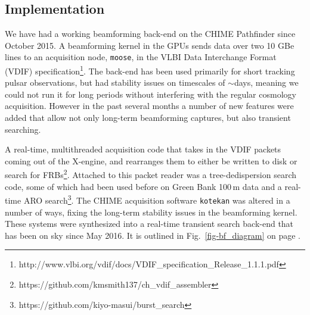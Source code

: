 \subsection{Implementation}

We have had a working beamforming back-end on the CHIME 
Pathfinder since October 2015. 
A beamforming kernel in the GPUs sends data over two 10 GBe
lines to an acquisition node, {\tt moose}, 
in the VLBI Data Interchange Format (VDIF) 
specification\footnote{http://www.vlbi.org/vdif/docs/VDIF\_specification\_Release\_1.1.1.pdf}. 
The back-end has been used primarily 
for short tracking pulsar observations, but had stability issues 
on timescales of $\sim$days, meaning we could not run it 
for long periods without interfering with the regular cosmology acquisition. 
However in the past several months a number of new features 
were added that allow not only long-term beamforming captures, 
but also transient searching. 
 
A real-time, multithreaded acquisition code that takes in the VDIF 
packets coming out of the X-engine, and rearranges them to either be written to disk or search for 
FRBs\footnote{https://github.com/kmsmith137/ch\_vdif\_assembler}. Attached 
to this packet reader was a tree-dedispersion search code, some of 
which had been used before on Green Bank 100\,m data and a real-time ARO 
search\footnote{https://github.com/kiyo-masui/burst\_search}.
The CHIME acquisition software {\tt kotekan} was 
altered in a number of ways, fixing the long-term 
stability issues in the beamforming kernel. These systems 
were synthesized into a real-time transient search back-end 
that has been on sky since May 2016. 
It is outlined in Fig.~\ref{fig-bf_diagram}
on page \pageref{fig-bf_diagram}. 



